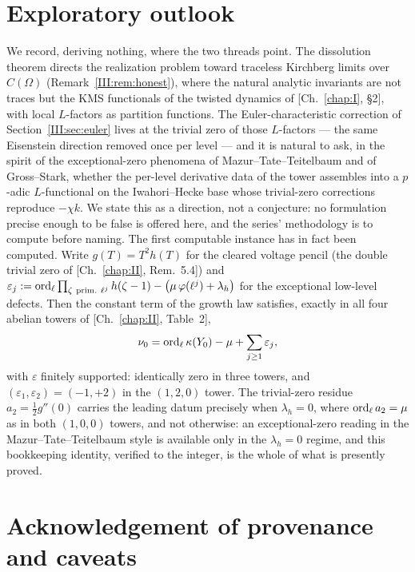 \section{Exploratory outlook}\label{III:sec:outlook}

We record, deriving nothing, where the two threads point. The dissolution theorem
directs the realization problem toward traceless Kirchberg limits over $C(\Omega)$
(Remark~\ref{III:rem:honest}), where the natural analytic invariants are not traces but
the KMS functionals of the twisted dynamics of [Ch.~\ref{chap:I}, \S2], with local $L$-factors as
partition functions. The Euler-characteristic correction of
Section~\ref{III:sec:euler} lives at the trivial zero of those $L$-factors --- the same
Eisenstein direction removed once per level --- and it is natural to ask, in the
spirit of the exceptional-zero phenomena of Mazur--Tate--Teitelbaum and of
Gross--Stark, whether the per-level derivative data of the tower assembles into a
$p$-adic $L$-functional on the Iwahori--Hecke base whose trivial-zero corrections
reproduce $-\chi k$. We state this as a direction, not a conjecture: no formulation
precise enough to be false is offered here, and the series' methodology is to compute
before naming. The first computable instance has in fact been computed. Write
$g(T)=T^2h(T)$ for the cleared voltage pencil (the double trivial zero of [Ch.~\ref{chap:II}, Rem.~5.4]) and
$\varepsilon_j:=\ord_\ell\prod_{\zeta\ \mathrm{prim.}\ \ell^j}h(\zeta-1)
-\bigl(\mu\,\varphi(\ell^j)+\lambda_h\bigr)$
for the exceptional low-level defects. Then the constant term of the growth law
satisfies, exactly in all four abelian towers of [Ch.~\ref{chap:II}, Table~2],
\[
\nu_0=\operatorname{ord}_\ell\kappa(Y_0)-\mu+\sum_{j\ge1}\varepsilon_j ,
\]
with $\varepsilon$ finitely supported: identically zero in three towers, and
$(\varepsilon_1,\varepsilon_2)=(-1,+2)$ in the $(1,2,0)$ tower. The trivial-zero
residue $a_2=\tfrac12g''(0)$ carries the leading datum precisely when $\lambda_h=0$,
where $\operatorname{ord}_\ell a_2=\mu$ as in both $(1,0,0)$ towers, and not otherwise: an
exceptional-zero reading in the Mazur--Tate--Teitelbaum style is available only in
the $\lambda_h=0$ regime, and this bookkeeping identity, verified to the integer, is
the whole of what is presently proved.

\section*{Acknowledgement of provenance and caveats}

